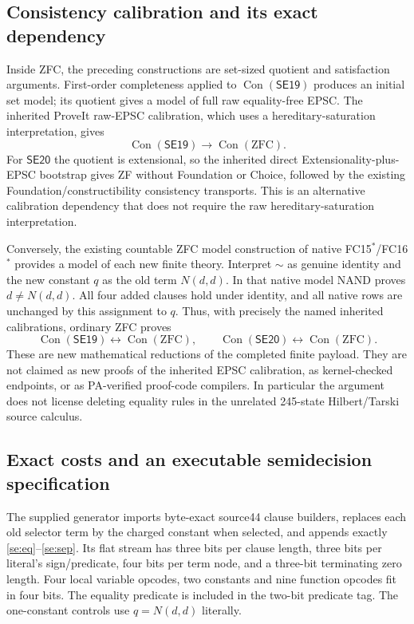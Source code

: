 \subsection{Consistency calibration and its exact dependency}

Inside ZFC, the preceding constructions are set-sized quotient and
satisfaction arguments. First-order completeness applied to
$\operatorname{Con}(\mathsf{SE19})$ produces an initial set model;
its quotient gives a model of full raw equality-free EPSC. The inherited
ProveIt raw-EPSC calibration, which uses a hereditary-saturation
interpretation, gives
\[
 \operatorname{Con}(\mathsf{SE19})\to
 \operatorname{Con}(\mathrm{ZFC}).
\]
For $\mathsf{SE20}$ the quotient is extensional, so the inherited
direct Extensionality-plus-EPSC bootstrap gives ZF without Foundation
or Choice, followed by the existing Foundation/constructibility
consistency transports. This is an alternative calibration dependency
that does not require the raw hereditary-saturation interpretation.

Conversely, the existing countable ZFC model construction of native
FC15$^*$/FC16$^*$ provides a model of each new finite theory. Interpret
$\sim$ as genuine identity and the new constant $q$ as the old term
$N(d,d)$. In that native model NAND proves $d\ne N(d,d)$.
All four added clauses hold under identity, and all native rows are
unchanged by this assignment to $q$. Thus, with precisely the named
inherited calibrations, ordinary ZFC proves
\[
 \operatorname{Con}(\mathsf{SE19})\leftrightarrow
 \operatorname{Con}(\mathrm{ZFC}),\qquad
 \operatorname{Con}(\mathsf{SE20})\leftrightarrow
 \operatorname{Con}(\mathrm{ZFC}).
\]
These are new mathematical reductions of the completed finite payload.
They are not claimed as new proofs of the inherited EPSC calibration,
as kernel-checked endpoints, or as PA-verified proof-code compilers.
In particular the argument does not license deleting equality rules in
the unrelated 245-state Hilbert/Tarski source calculus.

\subsection{Exact costs and an executable semidecision specification}

The supplied generator imports byte-exact source44 clause builders,
replaces each old selector term by the charged constant when selected,
and appends exactly \eqref{se:eq}--\eqref{se:sep}. Its flat stream has
three bits per clause length, three bits per literal's sign/predicate,
four bits per term node, and a three-bit terminating zero length.
Four local variable opcodes, two constants and nine function opcodes
fit in four bits. The equality predicate is included in the two-bit
predicate tag. The one-constant controls use $q=N(d,d)$ literally.

